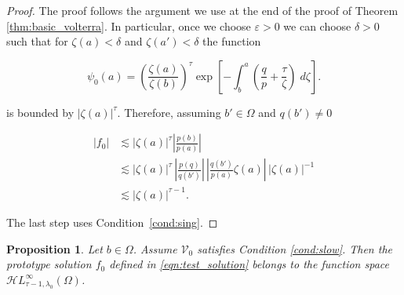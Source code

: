 \documentclass{article}
\theoremstyle{plain}
\newtheorem{prop}{Proposition}
\newcommand{\singexp}[2]{\mathcal{H}L^\infty_{#1, #2}}
\newcommand{\hardpart}{\mathcal{V}_0}
\newcommand{\domain}{\Omega}
\begin{document}
\begin{proof}
The proof follows the argument we use at the end of the proof of Theorem \ref{thm:basic_volterra}. In particular, once we choose $\varepsilon>0$ we can choose $\delta>0$ such that for $\zeta(a)<\delta$ and $\zeta(a')<\delta$ the function

\[ \psi_0(a) = \left(\frac{\zeta(a)}{\zeta(b)}\right)^\tau \exp\left[-\int_b^a \left( \frac{q}{p} + \frac{\tau}{\zeta} \right)\;d\zeta\right]. \]

is bounded by $ |\zeta(a)|^\tau$. Therefore, assuming $b'\in\Omega$ and $q(b') \neq 0$

\begin{align*}
|f_0| &  \lesssim |\zeta(a)|^\tau  \left\vert  \frac{p(b)}{p(a)}\right\vert \\
& \lesssim |\zeta(a)|^\tau \, \left\vert\frac{p(q)}{q(b')} \right\vert \, \left\vert \frac{q(b')}{p(a)} \zeta(a)\right\vert \, |\zeta(a)|^{-1} \\
&  \lesssim |\zeta(a)|^{\tau-1}.
\end{align*}

The last step uses Condition~\eqref{cond:sing}. 
\end{proof}
\begin{prop}\label{prop:asymptotic at infinity}
    Let $b\in\domain$. Assume $\hardpart$ satisfies {\em Condition} \eqref{cond:slow}. Then the prototype solution $f_0$ defined in \eqref{eqn:test_solution} belongs to the function space $\singexp{\tau-1}{\lambda_0}(\domain)$.
\end{prop}
\end{document}
